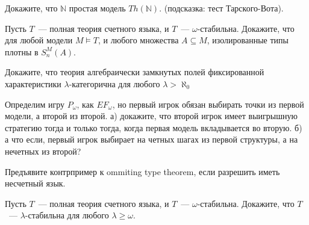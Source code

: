 \setcounter{curtask}{20}


\begin{task}
    Докажите, что $\mathbb{N}$ простая модель $Th(\mathbb{N})$. (подсказка: тест
    Тарского-Вота).
\end{task}

\begin{task}
    Пусть $T$~--- полная теория счетного языка, и $T$~---
    $\omega$-стабильна. Докажите, что для любой модели $M \models T$, и любого
    множества $A \subseteq M$, изолированные типы плотны в $S_n^M(A)$. 
\end{task}

\breakline


\begin{ptask}{6}
    Докажите, что теория алгебраически замкнутых полей фиксированной характеристики
    $\lambda$-категорична для любого $\lambda > \aleph_0$
\end{ptask}

\begin{ptask}{9}
    Определим игру $P_{\omega}$, как $EF_{\omega}$, но первый игрок обязан выбирать
    точки из первой модели, а второй из второй.
	а) докажите, что второй игрок имеет выигрышную стратегию тогда и только тогда,
    когда первая модель вкладывается во вторую.
    б) а что если, первый игрок выбирает на четных шагах из первой структуры, а на
    нечетных из второй?
\end{ptask}


\begin{ptask}{18}
    Предъявите контрпример к ommiting type theorem, если разрешить иметь несчетный
    язык.
\end{ptask}

\begin{ptask}{19}
    Пусть $T$~--- полная теория счетного языка, и $T$~---
    $\omega$-стабильна. Докажите, что $T$~--- $\lambda$-стабильна для любого $\lambda
    \ge \omega$.
\end{ptask}